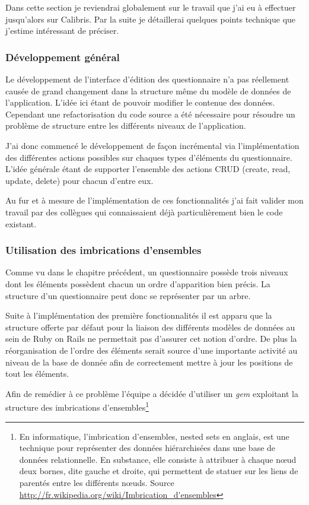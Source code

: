 \documentclass[12pt,a4paper]{book}
\begin{document}
Dans cette section je reviendrai globalement sur le travail que j'ai eu à effectuer jusqu'alors sur Calibris. Par la suite je détaillerai quelques points technique que j'estime intéressant de préciser.

\subsubsection{Développement général}

Le développement de l'interface d'édition des questionnaire n'a pas réellement causée de grand changement dans la structure même du modèle de données de l'application. L'idée ici étant de pouvoir modifier le contenue des données. Cependant une refactorisation du code source a été nécessaire pour résoudre un problème de structure entre les différents niveaux de l'application.

J'ai donc commencé le développement de façon incrémental via l'implémentation des différentes actions possibles sur chaques types d'éléments du questionnaire. L'idée générale étant de supporter l'ensemble des actions CRUD (create, read, update, delete) pour chacun d'entre eux.

Au fur et à mesure de l'implémentation de ces fonctionnalités j'ai fait valider mon travail par des collègues qui connaissaient déjà particulièrement bien le code existant.

\subsubsection{Utilisation des imbrications d'ensembles}
\label{sec.aws}

Comme vu dans le chapitre précédent, un questionnaire possède trois niveaux dont les éléments possèdent chacun un ordre d'apparition bien précis. La structure d'un questionnaire peut donc se représenter par un arbre.

Suite à l'implémentation des première fonctionnalités il est apparu que la structure offerte par défaut pour la liaison des différents modèles de données au sein de Ruby on Rails ne permettait pas d'assurer cet notion d'ordre. De plus la réorganisation de l'ordre des éléments serait source d'une importante activité au niveau de la base de donnée afin de correctement mettre à jour les positions de tout les éléments.

Afin de remédier à ce problème l'équipe a décidée d'utiliser un \textit{gem} exploitant la structure des imbrications d'ensembles\footnote{En informatique, l'imbrication d'ensembles, nested sets en anglais, est une technique pour représenter des données hiérarchisées dans une base de données relationnelle. En substance, elle consiste à attribuer à chaque nœud deux bornes, dite gauche et droite, qui permettent de statuer sur les liens de parentés entre les différents nœuds. Source \url{http://fr.wikipedia.org/wiki/Imbrication_d'ensembles}}
\end{document}
